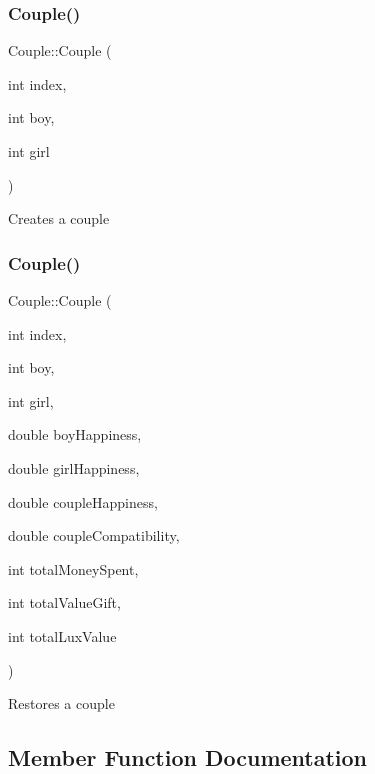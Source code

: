 \subsubsection{\texorpdfstring{Couple()}{Couple()}\hspace{0.1cm}{\footnotesize\ttfamily [1/2]}}
{\footnotesize\ttfamily Couple\+::\+Couple (\begin{DoxyParamCaption}\item[{int}]{index,  }\item[{int}]{boy,  }\item[{int}]{girl }\end{DoxyParamCaption})}

Creates a couple \mbox{\label{class_couple_a6f82dc74dea2eac7998499841545a796}} 
\subsubsection{\texorpdfstring{Couple()}{Couple()}\hspace{0.1cm}{\footnotesize\ttfamily [2/2]}}
{\footnotesize\ttfamily Couple\+::\+Couple (\begin{DoxyParamCaption}\item[{int}]{index,  }\item[{int}]{boy,  }\item[{int}]{girl,  }\item[{double}]{boy\+Happiness,  }\item[{double}]{girl\+Happiness,  }\item[{double}]{couple\+Happiness,  }\item[{double}]{couple\+Compatibility,  }\item[{int}]{total\+Money\+Spent,  }\item[{int}]{total\+Value\+Gift,  }\item[{int}]{total\+Lux\+Value }\end{DoxyParamCaption})}

Restores a couple 

\subsection{Member Function Documentation}
\mbox{\label{class_couple_af83e7bba22f91af32166d757347c8331}} 
